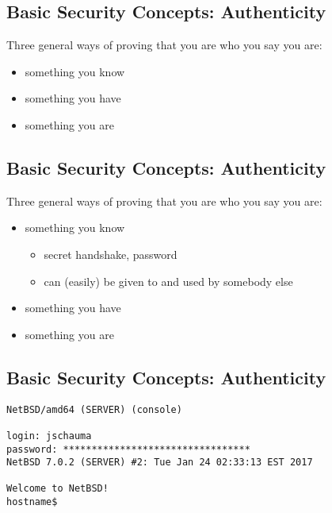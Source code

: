 \documentclass[xga]{xdvislides}
\begin{document}
\subsection{Basic Security Concepts: Authenticity}
Three general ways of proving that you are who you say you are:
\begin{itemize}
	\item something you know
	\item something you have
	\item something you are
\end{itemize}

\subsection{Basic Security Concepts: Authenticity}
Three general ways of proving that you are who you say you are:
\begin{itemize}
	\item something you know
		\begin{itemize}
			\item secret handshake, password
			\item can (easily) be given to and used by somebody else
		\end{itemize}
	\item something you have
	\item something you are
\end{itemize}

\subsection{Basic Security Concepts: Authenticity}
\begin{verbatim}
NetBSD/amd64 (SERVER) (console)

login: jschauma
password: *********************************
NetBSD 7.0.2 (SERVER) #2: Tue Jan 24 02:33:13 EST 2017

Welcome to NetBSD!
hostname$ 
\end{verbatim}
\end{document}
